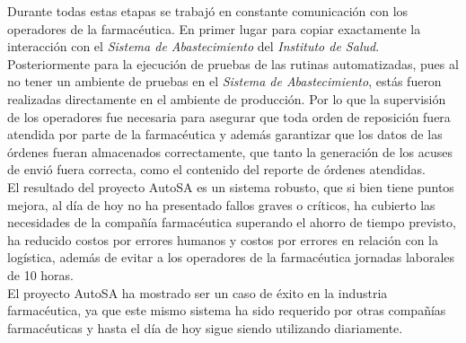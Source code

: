Durante todas estas etapas se trabajó en constante comunicación con los operadores de la farmacéutica. En primer lugar para copiar exactamente la interacción con el \textit{Sistema de Abastecimiento} del \textit{Instituto de Salud}. Posteriormente para la ejecución de pruebas de las rutinas automatizadas, pues al no tener un ambiente de pruebas en el \textit{Sistema de Abastecimiento}, estás fueron realizadas directamente en el ambiente de producción. Por lo que la supervisión de los operadores fue necesaria para asegurar que toda orden de reposición fuera atendida por parte de la farmacéutica y además garantizar que los datos de las órdenes fueran almacenados correctamente, que tanto la generación de los acuses de envió fuera correcta, como el contenido del reporte de órdenes atendidas.\\
El resultado del proyecto AutoSA es un sistema robusto, que si bien tiene puntos mejora, al día de hoy no ha presentado fallos graves o críticos, ha cubierto las necesidades de la compañía farmacéutica superando el ahorro de tiempo previsto, ha reducido costos por errores humanos y costos por errores en relación con la logística, además de evitar a los operadores de la farmacéutica jornadas laborales de 10 horas.\\
El proyecto AutoSA ha mostrado ser un caso de éxito en la industria farmacéutica, ya que este mismo sistema ha sido requerido por otras compañías farmacéuticas y hasta el día de hoy sigue siendo  utilizando diariamente.\\
